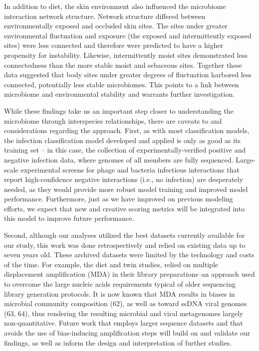 \documentclass[12pt,]{article}
\begin{document}
In addition to diet, the skin environment also influenced the microbiome
interaction network structure. Network structure differed between
environmentally exposed and occluded skin sites. The sites under greater
environmental fluctuation and exposure (the exposed and intermittently
exposed sites) were less connected and therefore were predicted to have
a higher propensity for instability. Likewise, intermittently moist
sites demonstrated less connectedness than the more stable moist and
sebaceous sites. Together these data suggested that body sites under
greater degrees of fluctuation harbored less connected, potentially less
stable microbiomes. This points to a link between microbiome and
environmental stability and warrants further investigation.

While these findings take us an important step closer to understanding
the microbiome through interspecies relationships, there are caveats to
and considerations regarding the approach. First, as with most
classification models, the infection classification model developed and
applied is only as good as its training set -- in this case, the
collection of experimentally-verified positive and negative infection
data, where genomes of all members are fully sequenced. Large-scale
experimental screens for phage and bacteria infectious interactions that
report high-confidence negative interactions (i.e., no infection) are
desperately needed, as they would provide more robust model training and
improved model performance. Furthermore, just as we have improved on
previous modeling efforts, we expect that new and creative scoring
metrics will be integrated into this model to improve future
performance.

Second, although our analyses utilized the best datasets currently
available for our study, this work was done retrospectively and relied
on existing data up to seven years old. These archived datasets were
limited by the technology and costs of the time. For example, the diet
and twin studies, relied on multiple displacement amplification (MDA) in
their library preparations--an approach used to overcome the large
nucleic acids requirements typical of older sequencing library
generation protocols. It is now known that MDA results in biases in
microbial community composition (62), as well as toward ssDNA viral
genomes (63, 64), thus rendering the resulting microbial and viral
metagenomes largely non-quantitative. Future work that employs larger
sequence datasets and that avoids the use of bias-inducing amplification
steps will build on and validate our findings, as well as inform the
design and interpretation of further studies.
\end{document}
